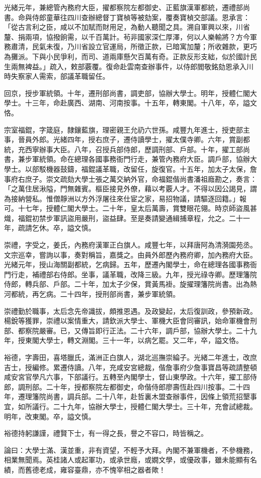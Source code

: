 \begin{pinyinscope}
光緒元年，兼總管內務府大臣，擢都察院左都御史、正藍旗漢軍都統，遷禮部尚書。命與侍郎童華往四川查辦總督丁寶楨等被劾案，覆奏寶楨交部議。恩承言：「從古言利之臣，咸以不加賦而財用足，為動人聽聞之具。溯自軍興以來，川省釐、捐兩項，協撥餉需，以千百萬計。茍非國家深仁厚澤，何以人樂輸將？方今軍務肅清，民氣未復，乃川省設立官運局，所徵正款，已暗寓加釐；所收雜款，更巧為攤派。下與小民爭利，而司、道兩庫懸欠百萬有奇。正款反形支絀，似於國計民生兩無裨益。」疏入，敕部覈覆。復命赴雲南查辦事件，以侍郎閻敬銘劾恩承入川時失察家人需索，部議革職留任。

回京，授步軍統領。十年，遷刑部尚書，調吏部，協辦大學士。明年，授體仁閣大學士。十三年，命赴廣西、湖南、河南按事。十五年，轉東閣。十八年，卒，謚文恪。

宗室福錕，字箴庭，隸鑲藍旗，理密親王允礽六世孫。咸豐九年進士，授吏部主事，晉員外郎。光緒四年，授右庶子，遷侍讀學士，擢太僕寺卿。六年，賞副都統，充西寧辦事大臣。八年，召授兵部侍郎，歷調刑部、戶部。十年，擢工部尚書，兼步軍統領。命在總理各國事務衙門行走，兼管內務府大臣。調戶部，協辦大學士。以部駁機器鼓鑄，福錕議革職，改留任，旋復官。十五年，加太子太保，詹事府右庶子。崇文疏劾大學士張之萬交納外官，命福錕偕尚書潘祖廕勘之，奏言：「之萬住居湫隘，門無雜賓。樞臣接見外僚，藉以考覈人才。不得以因公謁見，謂為接納營私。惟僧靜洲以方外浮屠往來仕宦之家，易招物議，請驅逐回籍。」報可。十七年，授體仁閣大學士。二十年，皇太后萬壽，賞雙眼花翎。時京師盜風甚熾，福錕初禁步軍訊盜用嚴刑，盜益肆。至是奏請變通緝捕章程，允之。二十一年，疏請乞休。卒，謚文慎。

崇禮，字受之，姜氏，內務府漢軍正白旗人。咸豐七年，以拜唐阿為清漪園苑丞。文宗巡幸，嘗詢以事，奏對稱旨，嘉獎之。由員外郎歷內務府卿，加內務府大臣。光緒元年，授山海關副都統，乞病歸。五年，歷遷內閣學士，命在總理各國事務衙門行走，補禮部右侍郎。坐事，議革職，改降三級。九年，授光祿寺卿。歷理籓院侍郎，轉兵部、戶部。二十年，加太子少保，賞黃馬褂。旋擢理籓院尚書。出為熱河都統，再乞病。二十四年，授刑部尚書，兼步軍統領。

崇禮勤於職事，太后念先帝識拔，頗推恩遇。及政變起，太后復訓政，參預新政。楊銳等獲罪，崇禮以案情重大，請欽派大學士、軍機大臣會同審訊，始命軍機會刑部、都察院嚴審。已，又傳旨即行正法。二十六年，調戶部，協辦大學士。二十九年，授東閣大學士，轉文淵閣。三十一年，以病乞罷。又二年，卒，謚文恪。

裕德，字壽田，喜塔臘氏，滿洲正白旗人，湖北巡撫崇綸子。光緒二年進士，改庶吉士，授編修。累遷侍讀。八年，充咸安宮總裁，偕詹事府少詹事寶昌等疏請整頓咸安宮官學凡六事，下部議行。五轉至內閣學士，督山東學政。十六年，擢工部侍郎，調刑部。二十年，授都察院左都御史，命偕侍郎廖壽恆赴四川按事。二十四年，遷理籓院尚書，調兵部。二十八年，赴哲裏木盟查辦事件，因條上領荒招墾事宜，如所議行。二十九年，協辦大學士，授體仁閣大學士。三十年，充會試總裁。明年，改東閣。卒，謚文慎。

裕德持躬謙謹，禮賢下士，有一得之長，譽之不容口，時皆稱之。

論曰：大學士滿、漢並重，非有資望，不輕予大拜。內閣不兼軍機者，不參機務，相業無聞焉。英桂諸人或起軍功，或承世廕，或嫺文學，或優政事，雖未能顯有名績，而舊德老成，雍容臺鼎，亦不愧宰相之器者歟！


\end{pinyinscope}